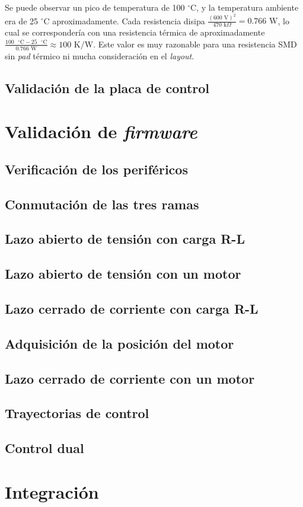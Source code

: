 Se puede observar un pico de temperatura de 100 $^{\circ}$C, y la temperatura ambiente era de 25 $^{\circ}$C aproximadamente. Cada resistencia disipa $\frac{(600 \text{ V})^2}{470 \text{ k}\Omega} = 0.766 \text{ W}$, lo cual se correspondería con una resistencia térmica de aproximadamente $ \frac{100 \text{ }^{\circ}\text{C} - 25 \text{ }^{\circ}\text{C}}{0.766 \text{ W}} \approx 100 \text{ K/W}$. Este valor es muy razonable para una resistencia SMD sin \textit{pad} térmico ni mucha consideración en el \textit{layout}.

\subsection{Validación de la placa de control}


\section{Validación de \textit{firmware}}
\subsection{Verificación de los periféricos}

\subsection{Conmutación de las tres ramas}

\subsection{Lazo abierto de tensión con carga R-L}

\subsection{Lazo abierto de tensión con un motor}

\subsection{Lazo cerrado de corriente con carga R-L}

\subsection{Adquisición de la posición del motor}

\subsection{Lazo cerrado de corriente con un motor}

\subsection{Trayectorias de control}

\subsection{Control dual}

\section{Integración}
